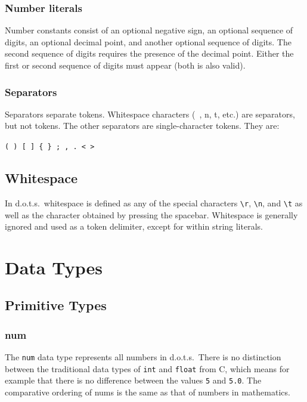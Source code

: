 \documentclass{article}
\newcommand{\pltlang}{d.o.t.s.} %
\newcommand{\code}[1]{\texttt{#1}} %
\begin{document}
\subsubsection{Number literals}

Number constants consist of an optional negative sign, an optional sequence of digits, 
an optional decimal point, and another optional sequence of digits. The second 
sequence of digits requires the presence of the decimal point. Either the first or second sequence of digits must appear (both is also valid).

\subsubsection{Separators}

Separators separate tokens. Whitespace characters (\textquotesingle \ \textquotesingle, \textquotesingle{\textbackslash}n\textquotesingle, \textquotesingle{\textbackslash}t\textquotesingle, etc.) are separators, but not tokens. The other separators are single-character tokens. They are:

\code{( ) [ ] \{ \} ; , . < >}

\subsection {Whitespace}
In \pltlang\, whitespace is defined as any of the special characters \code{\textbackslash r}, \code{\textbackslash n},  and \code{\textbackslash t} as well as the character obtained by pressing the spacebar. Whitespace is generally ignored and used as a token delimiter, except for within string literals.


\section{Data Types}

\subsection{Primitive Types}

\subsubsection{num}

The \code{num} data type represents all numbers in \pltlang\ There is no distinction between the traditional data types of \code{int} and \code{float} from C, which means for example that there is no difference between the values \code{5} and \code{5.0}. The comparative ordering of nums is the same as that of numbers in mathematics. 
\end{document}
